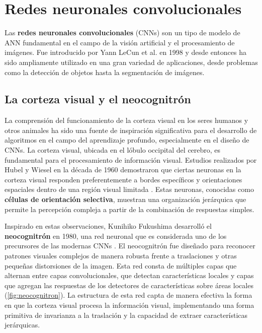 
\chapter{Redes neuronales convolucionales}

Las \textbf{redes neuronales convolucionales} (CNNs) \cite{krizhevsky2012imagenet} son un tipo de modelo de ANN fundamental en el campo de la visión artificial y el procesamiento de imágenes. Fue introducido por Yann LeCun et al. en 1998 \cite{lecun1998gradient} y desde entonces ha sido ampliamente utilizado en una gran variedad de aplicaciones, desde problemas como la detección de objetos hasta la segmentación de imágenes.

\section{La corteza visual y el neocognitrón}

La comprensión del funcionamiento de la corteza visual en los seres humanos y otros animales ha sido una fuente de inspiración significativa para el desarrollo de algoritmos en el campo del aprendizaje profundo, especialmente en el diseño de CNNs. La corteza visual, ubicada en el lóbulo occipital del cerebro, es fundamental para el procesamiento de información visual. Estudios realizados por Hubel y Wiesel en la década de 1960 demostraron que ciertas neuronas en la corteza visual responden preferentemente a bordes específicos y orientaciones espaciales dentro de una región visual limitada \cite{hubel1962receptive}. Estas neuronas, conocidas como \textbf{células de orientación selectiva}, muestran una organización jerárquica que permite la percepción compleja a partir de la combinación de respuestas simples.

Inspirado en estas observaciones, Kunihiko Fukushima desarrolló el \textbf{neocognitrón} en 1980, una red neuronal que es considerada uno de los precursores de las modernas CNNs \cite{fukushima1980neocognitron}. El neocognitrón fue diseñado para reconocer patrones visuales complejos de manera robusta frente a traslaciones y otras pequeñas distorsiones de la imagen. Esta red consta de múltiples capas que alternan entre capas convolucionales, que detectan características locales y capas que agregan las respuestas de los detectores de características sobre áreas locales (\autoref{fig:neocognitron}). La estructura de esta red capta de manera efectiva la forma en que la corteza visual procesa la información visual, implementando una forma primitiva de invarianza a la traslación y la capacidad de extraer características jerárquicas.

